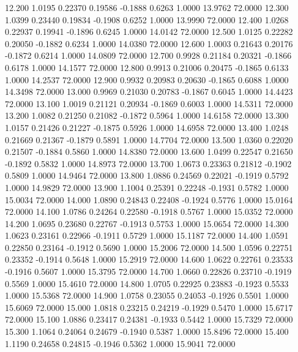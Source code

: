   12.200   1.0195   0.22370   0.19586  -0.1888   0.6263   1.0000  13.9762  72.0000
  12.300   1.0399   0.23440   0.19834  -0.1908   0.6252   1.0000  13.9990  72.0000
  12.400   1.0268   0.22937   0.19941  -0.1896   0.6245   1.0000  14.0142  72.0000
  12.500   1.0125   0.22282   0.20050  -0.1882   0.6234   1.0000  14.0380  72.0000
  12.600   1.0003   0.21643   0.20176  -0.1872   0.6214   1.0000  14.0809  72.0000
  12.700   0.9928   0.21184   0.20321  -0.1866   0.6178   1.0000  14.1577  72.0000
  12.800   0.9913   0.21006   0.20475  -0.1865   0.6133   1.0000  14.2537  72.0000
  12.900   0.9932   0.20983   0.20630  -0.1865   0.6088   1.0000  14.3498  72.0000
  13.000   0.9969   0.21030   0.20783  -0.1867   0.6045   1.0000  14.4423  72.0000
  13.100   1.0019   0.21121   0.20934  -0.1869   0.6003   1.0000  14.5311  72.0000
  13.200   1.0082   0.21250   0.21082  -0.1872   0.5964   1.0000  14.6158  72.0000
  13.300   1.0157   0.21426   0.21227  -0.1875   0.5926   1.0000  14.6958  72.0000
  13.400   1.0248   0.21669   0.21367  -0.1879   0.5891   1.0000  14.7704  72.0000
  13.500   1.0360   0.22020   0.21507  -0.1884   0.5860   1.0000  14.8380  72.0000
  13.600   1.0499   0.22547   0.21650  -0.1892   0.5832   1.0000  14.8973  72.0000
  13.700   1.0673   0.23363   0.21812  -0.1902   0.5809   1.0000  14.9464  72.0000
  13.800   1.0886   0.24569   0.22021  -0.1919   0.5792   1.0000  14.9829  72.0000
  13.900   1.1004   0.25391   0.22248  -0.1931   0.5782   1.0000  15.0034  72.0000
  14.000   1.0890   0.24843   0.22408  -0.1924   0.5776   1.0000  15.0164  72.0000
  14.100   1.0786   0.24264   0.22580  -0.1918   0.5767   1.0000  15.0352  72.0000
  14.200   1.0695   0.23680   0.22767  -0.1913   0.5753   1.0000  15.0654  72.0000
  14.300   1.0623   0.23161   0.22966  -0.1911   0.5729   1.0000  15.1187  72.0000
  14.400   1.0591   0.22850   0.23164  -0.1912   0.5690   1.0000  15.2006  72.0000
  14.500   1.0596   0.22751   0.23352  -0.1914   0.5648   1.0000  15.2919  72.0000
  14.600   1.0622   0.22761   0.23533  -0.1916   0.5607   1.0000  15.3795  72.0000
  14.700   1.0660   0.22826   0.23710  -0.1919   0.5569   1.0000  15.4610  72.0000
  14.800   1.0705   0.22925   0.23883  -0.1923   0.5533   1.0000  15.5368  72.0000
  14.900   1.0758   0.23055   0.24053  -0.1926   0.5501   1.0000  15.6069  72.0000
  15.000   1.0818   0.23215   0.24219  -0.1929   0.5470   1.0000  15.6717  72.0000
  15.100   1.0886   0.23417   0.24381  -0.1933   0.5442   1.0000  15.7329  72.0000
  15.300   1.1064   0.24064   0.24679  -0.1940   0.5387   1.0000  15.8496  72.0000
  15.400   1.1190   0.24658   0.24815  -0.1946   0.5362   1.0000  15.9041  72.0000
